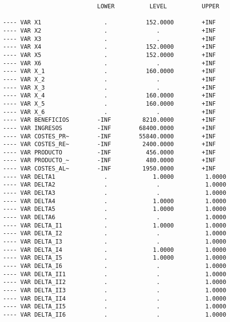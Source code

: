 \documentclass[12pt,a4paper,twoside,openright,titlepage,final]{article}
\begin{document}
\begin{verbatim}
                           LOWER          LEVEL          UPPER        

---- VAR X1                  .           152.0000        +INF                
---- VAR X2                  .              .            +INF                
---- VAR X3                  .              .            +INF              
---- VAR X4                  .           152.0000        +INF                  
---- VAR X5                  .           152.0000        +INF            
---- VAR X6                  .              .            +INF              
---- VAR X_1                 .           160.0000        +INF               
---- VAR X_2                 .              .            +INF              
---- VAR X_3                 .              .            +INF               
---- VAR X_4                 .           160.0000        +INF            
---- VAR X_5                 .           160.0000        +INF                 
---- VAR X_6                 .              .            +INF                      
---- VAR BENEFICIOS        -INF         8210.0000        +INF                      
---- VAR INGRESOS          -INF        68400.0000        +INF                     
---- VAR COSTES_PR~        -INF        55840.0000        +INF                      
---- VAR COSTES_RE~        -INF         2400.0000        +INF                      
---- VAR PRODUCTO          -INF          456.0000        +INF                      
---- VAR PRODUCTO_~        -INF          480.0000        +INF                      
---- VAR COSTES_AL~        -INF         1950.0000        +INF                      
---- VAR DELTA1              .             1.0000         1.0000                  
---- VAR DELTA2              .              .             1.0000                  
---- VAR DELTA3              .              .             1.0000                  
---- VAR DELTA4              .             1.0000         1.0000                  
---- VAR DELTA5              .             1.0000         1.0000                  
---- VAR DELTA6              .              .             1.0000                  
---- VAR DELTA_I1            .             1.0000         1.0000            
---- VAR DELTA_I2            .              .             1.0000            
---- VAR DELTA_I3            .              .             1.0000            
---- VAR DELTA_I4            .             1.0000         1.0000            
---- VAR DELTA_I5            .             1.0000         1.0000            
---- VAR DELTA_I6            .              .             1.0000      
---- VAR DELTA_II1           .              .             1.0000            
---- VAR DELTA_II2           .              .             1.0000            
---- VAR DELTA_II3           .              .             1.0000            
---- VAR DELTA_II4           .              .             1.0000            
---- VAR DELTA_II5           .              .             1.0000            
---- VAR DELTA_II6           .              .             1.0000            

\end{verbatim}
\end{document}
